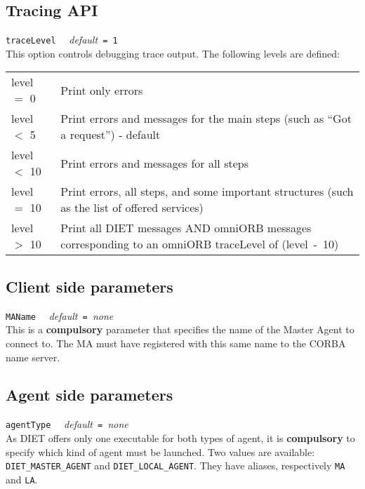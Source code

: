\subsection{Tracing API}

\noindent
\texttt{traceLevel} \ \ \emph{default}\texttt{ = 1}\\
This option controls debugging trace output. The following levels are defined:

\begin{center}
 \footnotesize
 \begin{tabular}{p{.1\linewidth}p{.8\linewidth}}
  level $=$ 0  & Print only errors\\
  level $<$ 5  & Print errors and messages for the main steps (such as ``Got a
  request'') - default\\
  level $<$ 10 & Print errors and messages for all steps\\
  level $=$ 10 & Print errors, all steps, and some important structures (such
  as the list of offered services)\\
  level $>$ 10 & Print all DIET messages AND omniORB messages corresponding to
  an omniORB traceLevel of (level~-~10)
 \end{tabular}
\end{center}


\subsection{Client side parameters}

\noindent
\texttt{MAName} \ \ \emph{default}\texttt{ = }\emph{none}\\
This is a \textbf{compulsory} parameter that specifies the name of the Master
Agent to connect to. The MA must have registered with this same name to the
CORBA name server.


\subsection{Agent side parameters}

\noindent
\texttt{agentType} \ \ \emph{default}\texttt{ = }\emph{none}\\
As DIET offers only one executable for both types of agent, it is
\textbf{compulsory} to specify which kind of agent must be launched. Two values
are available: \texttt{DIET\_MASTER\_AGENT} and \texttt{DIET\_LOCAL\_AGENT}.
They have aliases, respectively \texttt{MA} and \texttt{LA}.
\\

